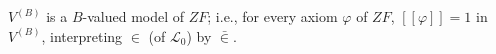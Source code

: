 $V^{(B)}$ is a $B$-valued model of $ZF$; i.e., for every axiom $\varphi$ of $ZF$, $[\![\varphi]\!] = 1$ in $V^{(B)}$, interpreting $\in$ (of $\mathcal{L}_0$) by $\bar{\in}$.
